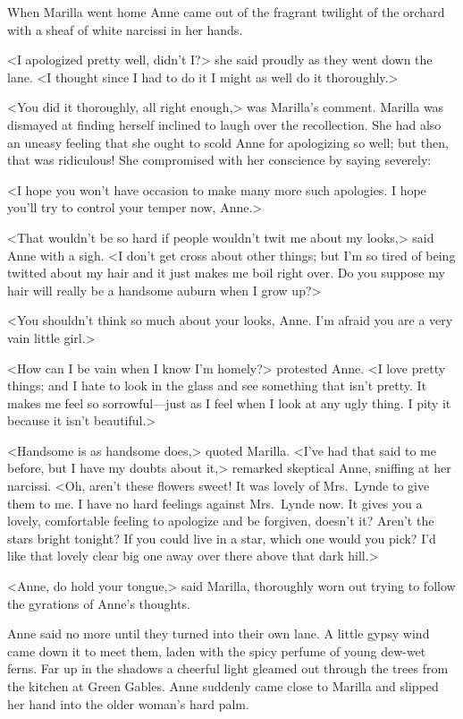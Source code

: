 When Marilla went home Anne came out of the fragrant twilight of the orchard with a sheaf of white narcissi in her hands.

<I apologized pretty well, didn't I\@?> she said proudly as they went down the lane. <I thought since I had to do it I might as well do it thoroughly.>

<You did it thoroughly, all right enough,> was Marilla's comment. Marilla was dismayed at finding herself inclined to laugh over the recollection. She had also an uneasy feeling that she ought to scold Anne for apologizing so well; but then, that was ridiculous! She compromised with her conscience by saying severely:

<I hope you won't have occasion to make many more such apologies. I hope you'll try to control your temper now, Anne.>

<That wouldn't be so hard if people wouldn't twit me about my looks,> said Anne with a sigh. <I don't get cross about other things; but I'm so tired of being twitted about my hair and it just makes me boil right over. Do you suppose my hair will really be a handsome auburn when I grow up?>

<You shouldn't think so much about your looks, Anne. I'm afraid you are a very vain little girl.>

<How can I be vain when I know I'm homely?> protested Anne. <I love pretty things; and I hate to look in the glass and see something that isn't pretty. It makes me feel so sorrowful—just as I feel when I look at any ugly thing. I pity it because it isn't beautiful.>

<Handsome is as handsome does,> quoted Marilla. <I've had that said to me before, but I have my doubts about it,> remarked skeptical Anne, sniffing at her narcissi. <Oh, aren't these flowers sweet! It was lovely of Mrs.~Lynde to give them to me. I have no hard feelings against Mrs.~Lynde now. It gives you a lovely, comfortable feeling to apologize and be forgiven, doesn't it? Aren't the stars bright tonight? If you could live in a star, which one would you pick? I'd like that lovely clear big one away over there above that dark hill.>

<Anne, do hold your tongue,> said Marilla, thoroughly worn out trying to follow the gyrations of Anne's thoughts.

Anne said no more until they turned into their own lane. A little gypsy wind came down it to meet them, laden with the spicy perfume of young dew-wet ferns. Far up in the shadows a cheerful light gleamed out through the trees from the kitchen at Green Gables. Anne suddenly came close to Marilla and slipped her hand into the older woman's hard palm.

